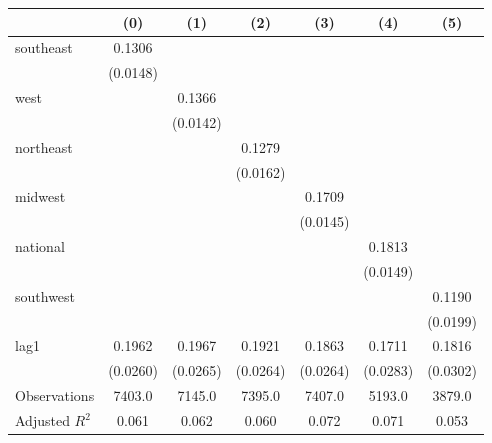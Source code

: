 \begin{tabular}{lcccccc}
\toprule
 & (0) & (1) & (2) & (3) & (4) & (5) \\
\midrule
southeast & 0.1306 &  &  &  &  &  \\
\vspace{0.2cm}
 & (0.0148) &  &  &  &  &  \\
west &  & 0.1366 &  &  &  &  \\
\vspace{0.2cm}
 &  & (0.0142) &  &  &  &  \\
northeast &  &  & 0.1279 &  &  &  \\
\vspace{0.2cm}
 &  &  & (0.0162) &  &  &  \\
midwest &  &  &  & 0.1709 &  &  \\
\vspace{0.2cm}
 &  &  &  & (0.0145) &  &  \\
national &  &  &  &  & 0.1813 &  \\
\vspace{0.2cm}
 &  &  &  &  & (0.0149) &  \\
southwest &  &  &  &  &  & 0.1190 \\
\vspace{0.2cm}
 &  &  &  &  &  & (0.0199) \\
lag1 & 0.1962 & 0.1967 & 0.1921 & 0.1863 & 0.1711 & 0.1816 \\
\vspace{0.2cm}
 & (0.0260) & (0.0265) & (0.0264) & (0.0264) & (0.0283) & (0.0302) \\
\midrule
Observations & 7403.0 & 7145.0 & 7395.0 & 7407.0 & 5193.0 & 3879.0 \\
Adjusted $R^2$ & 0.061 & 0.062 & 0.060 & 0.072 & 0.071 & 0.053 \\
\bottomrule
\end{tabular}
